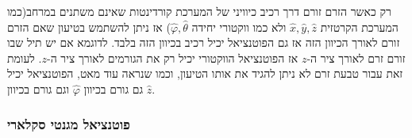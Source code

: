 \documentclass{tstextbook}
\begin{document}
\begin{remark}
רק כאשר הזרם זורם דרך רכיב כיוויני של המערכת קורדינטות שאינם משתנים במרחב(כמו המערכת הקרטזית \(\hat{x},\hat{y},\hat{z}\) ולא כמו ווקטורי יחידה \(\hat{\varphi},\hat{\theta}\))  אז ניתן להשתמש בטיעון שאם הזרם זורם לאורך הכיוון הזה אז גם הפוטנציאל יכיל רכיב בכיוון הזה בלבד.
לדוגמא אם יש תיל שבו זורם זרם לאורך ציר ה-\(z\) אז הפוטנציאל הווקטורי יכיל רק את הגורמים לאורך ציר ה-\(z\). לעומת זאת עבור טבעת זרם לא ניתן להגיד את אותו הטיעון, וכמו שנראה עוד מאט, הפוטנציאל יכיל גם גורם בכיוון \(\hat{\varphi}\) וגם גורם בכיוון \(\hat{z}\).

\end{remark}
\subsubsection{פוטנציאל מגנטי סקלארי}
\end{document}

